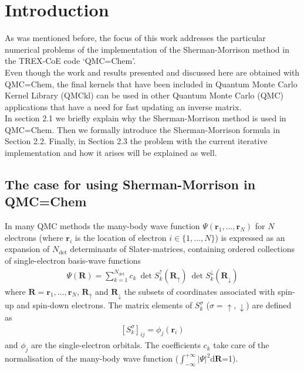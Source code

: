 \documentclass[11pt]{article}
\numberwithin{figure}{section}
\numberwithin{table}{section}
\begin{document}
  \section{Introduction}
	
      As was mentioned before, the focus of this work addresses the particular numerical problems of the implementation of the Sherman-Morrison method in the TREX-CoE code `QMC=Chem'.\\
      
      Even though the work and results presented and discussed here are obtained with QMC=Chem, the final kernels that have been included in Quantum Monte Carlo Kernel Library (QMCkl) can be used in other Quantum Monte Carlo (QMC) applications that have a need for fast updating an inverse matrix.\\
      
        In section 2.1 we briefly explain why the Sherman-Morrison method is used in QMC=Chem. Then we formally introduce the Sherman-Morrison formula in Section 2.2. Finally, in Section 2.3 the problem with the current iterative implementation and how it arises will be explained as well.
	
		\subsection{The case for using Sherman-Morrison in QMC=Chem}
			In many QMC methods the many-body wave function $\Psi(\mathbf{r}_1,\ldots,\mathbf{r}_N)$ for $N$ electrons (where $\mathbf{r}_i$ is the location of electron $i\in\{1,\ldots ,N\}$) is expressed as an expansion of $N_\mathrm{det}$ determinants of Slater-matrices, containing ordered collections of single-electron basis-wave functions
			\begin{align}\label{eqn:mbwf}
				\Psi(\mathbf{R}) = \sum_{k=1}^{N_\mathrm{det}}c_k\:\det S_k^\uparrow(\mathbf{R}_\uparrow)\:\det S_k^\downarrow(\mathbf{R}_\downarrow)
			\end{align}
			where $\mathbf{R}=\mathbf{r}_1,\ldots,\mathbf{r}_N$, $\mathbf{R}_\uparrow$ and $\mathbf{R}_\downarrow$ the subsets of coordinates associated with spin-up and spin-down electrons. The matrix elements of $S_k^\sigma$ ($\sigma=\uparrow,\downarrow$) are defined as 
			\begin{align}
				\left[S_k^\sigma\right]_{ij} = \phi_j(\mathbf{r}_i)
			\end{align}
			and $\phi_j$ are the single-electron orbitals. The coefficients $c_k$ take care of the normalisation of the many-body wave function ($\int_{-\infty}^{+\infty}|\Psi|^2\mathrm{d}\mathbf{R}$=1).\\
			
\end{document}
